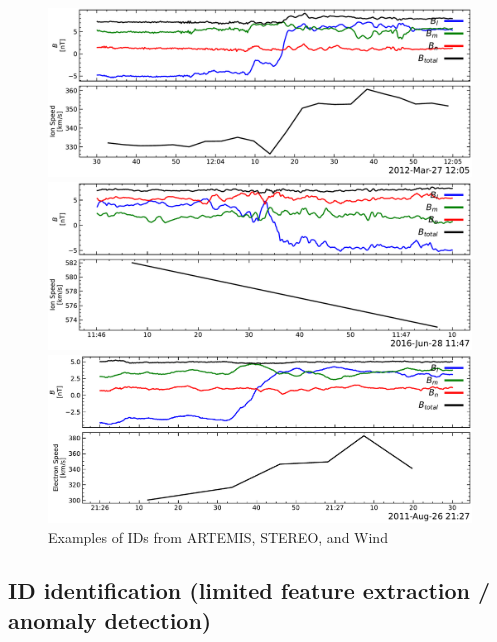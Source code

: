 \documentclass[
]{agujournal2019}
\begin{document}
\begin{figure}

\begin{minipage}{0.33\linewidth}
\includegraphics{figures/examples/artemis_id_example.pdf}\end{minipage}%
%
\begin{minipage}{0.33\linewidth}
\includegraphics{figures/examples/stereo_id_example.pdf}\end{minipage}%
%
\begin{minipage}{0.33\linewidth}
\includegraphics{figures/examples/wind_id_example.pdf}\end{minipage}%

\caption{\label{fig-examples}Examples of IDs from ARTEMIS, STEREO, and Wind}

\end{figure}%

\subsection{ID identification (limited feature extraction / anomaly detection)}\label{id-identification-limited-feature-extraction-anomaly-detection}
\end{document}
